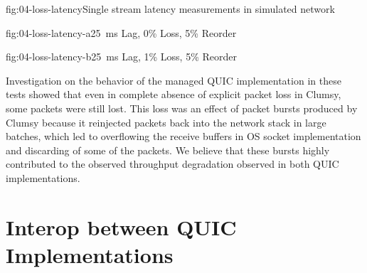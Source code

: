 \begin{myFigure}{fig:04-loss-latency}{Single stream latency measurements in simulated network}
\begin{mySubfigure}{0.49\linewidth}{fig:04-loss-latency-a}{\SI{25}{\milli\second} Lag, 0\% Loss, 5\% Reorder}
\footnotesize

\end{mySubfigure}
\begin{mySubfigure}{0.49\linewidth}{fig:04-loss-latency-b}{\SI{25}{\milli\second} Lag, 1\% Loss, 5\% Reorder}
\footnotesize

\end{mySubfigure}
\end{myFigure}

Investigation on the behavior of the managed QUIC implementation in these tests showed that even in
complete absence of explicit packet loss in Clumsy, some packets were still lost. This loss was an
effect of packet bursts produced by Clumsy because it reinjected packets back into the network stack
in large batches, which led to overflowing the receive buffers in OS socket implementation and
discarding of some of the packets. We believe that these bursts highly contributed to the observed
throughput degradation observed in both QUIC implementations.






\section{Interop between QUIC Implementations}

